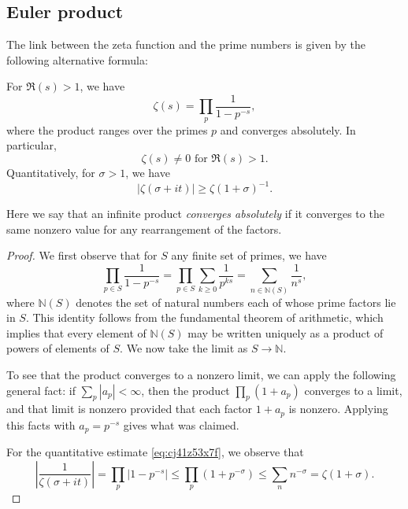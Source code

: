 \documentclass[reqno]{amsart}  \numberwithin{theorem}{section} \numberwithin{equation}{section}
\begin{document}
\subsection{Euler product}\label{sec:cj4020t3kt}
The link between the zeta function and the prime numbers is given by the following alternative formula:
\begin{lemma}\label{lemma:cj56e5ilni}
  For $\Re(s) > 1$, we have
  \begin{equation*}
    \zeta(s) = \prod_p \frac{1}{1 - p^{- s}},
  \end{equation*}
  where the product ranges over the primes $p$ and converges absolutely.  In particular,
  \begin{equation*}
    \zeta(s) \neq 0 \text{ for } \Re(s) > 1.
  \end{equation*}
  Quantitatively, for $\sigma > 1$, we have
  \begin{equation}\label{eq:cj41z53x7f}
    \lvert \zeta(\sigma + it) \rvert \geq \zeta(1 + \sigma)^{-1}.
  \end{equation}
\end{lemma}
Here we say that an infinite product \emph{converges absolutely} if it converges to the same nonzero value for any rearrangement of the factors.
\begin{proof}
  We first observe that for $S$ any finite set of primes, we have
  \begin{equation*}
    \prod_{p \in S}
    \frac{1}{1 - p^{- s}}
    = \prod_{p \in S}
    \sum_{k \geq 0} \frac{1}{ p^{k s}}
    =
    \sum_{n \in \mathbb{N}(S)}
    \frac{1}{n^s},
  \end{equation*}
  where $\mathbb{N}(S)$ denotes the set of natural numbers each of whose prime factors lie in $S$.  This identity follows from the fundamental theorem of arithmetic, which implies that every element of $\mathbb{N}(S)$ may be written uniquely as a product of powers of elements of $S$.  We now take the limit as $S \rightarrow \mathbb{N}$.

  To see that the product converges to a nonzero limit, we can apply the following general fact: if $\sum_p |a_p| < \infty$, then the product $\prod_{p} (1 + a_p)$ converges to a limit, and that limit is nonzero provided that each factor $1 + a_p$ is nonzero.  Applying this facts with $a_p = p^{-s}$ gives what was claimed.


  For the quantitative estimate \eqref{eq:cj41z53x7f}, we observe that
  \begin{equation*}
    \left\lvert \frac{1}{\zeta(\sigma + it)}  \right\rvert
    = \prod_p \left\lvert 1 - p^{-s} \right\rvert
    \leq \prod_p \left(  1 + p^{-\sigma} \right)
    \leq \sum_n n^{-\sigma} = \zeta(1 + \sigma).
  \end{equation*}
\end{proof}
\end{document}
